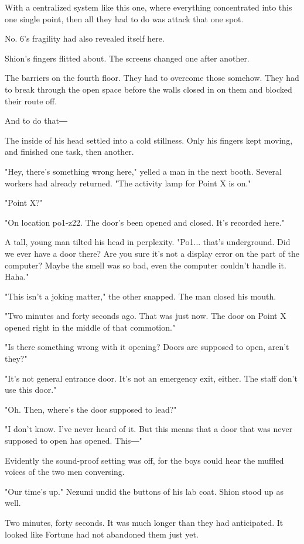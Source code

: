 With a centralized system like this one, where everything concentrated
into this one single point, then all they had to do was attack that one
spot.

No. 6's fragility had also revealed itself here.

Shion's fingers flitted about. The screens changed one after another.

The barriers on the fourth floor. They had to overcome those somehow.
They had to break through the open space before the walls closed in on
them and blocked their route off.

And to do that―

The inside of his head settled into a cold stillness. Only his fingers
kept moving, and finished one task, then another.

"Hey, there's something wrong here," yelled a man in the next booth.
Several workers had already returned. "The activity lamp for Point X is
on."

"Point X?"

"On location po1-z22. The door's been opened and closed. It's recorded
here."

A tall, young man tilted his head in perplexity. "Po1... that's
underground. Did we ever have a door there? Are you sure it's not a
display error on the part of the computer? Maybe the smell was so bad,
even the computer couldn't handle it. Haha."

"This isn't a joking matter," the other snapped. The man closed his
mouth.

"Two minutes and forty seconds ago. That was just now. The door on Point
X opened right in the middle of that commotion."

"Is there something wrong with it opening? Doors are supposed to open,
aren't they?"

"It's not general entrance door. It's not an emergency exit, either. The
staff don't use this door."

"Oh. Then, where's the door supposed to lead?"

"I don't know. I've never heard of it. But this means that a door that
was never supposed to open has opened. This―"

Evidently the sound-proof setting was off, for the boys could hear the
muffled voices of the two men conversing.

"Our time's up." Nezumi undid the buttons of his lab coat. Shion stood
up as well.

Two minutes, forty seconds. It was much longer than they had
anticipated. It looked like Fortune had not abandoned them just yet.

